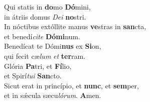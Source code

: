 \evenverse Qui statis in \textbf{do}mo \textbf{Dó}mini,~\*\\
\evenverse in átriis domus \textit{De}\textit{i} \textbf{no}stri.\\
\oddverse In nóctibus extóllite manus \textbf{ve}stras in \textbf{san}cta,~\*\\
\oddverse et benedí\textit{ci}\textit{te} \textbf{Dó}\textbf{mi}num.\\
\evenverse Benedícat te Dómi\textbf{nus} ex \textbf{Si}on,~\*\\
\evenverse qui fecit cæ\textit{lum} \textit{et} \textbf{ter}ram.\\
\oddverse Glória \textbf{Pa}tri, et \textbf{Fí}lio,~\*\\
\oddverse et Spirí\textit{tu}\textit{i} \textbf{San}cto.\\
\evenverse Sicut erat in princípio, et \textbf{nunc}, et \textbf{sem}per,~\*\\
\evenverse et in sǽcula sæcu\textit{ló}\textit{rum}. \textbf{A}men.\\
